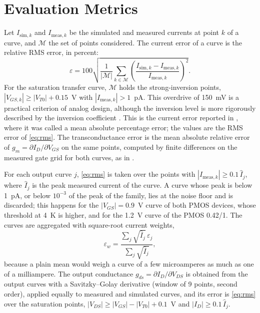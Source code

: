 \documentclass[a4paper,10pt,twoside,twocolumn,final]{JICS_LaTexGuidelines} %
\begin{document}
\section{Evaluation Metrics}

Let $I_{\mathrm{sim},k}$ and $I_{\mathrm{meas},k}$ be the simulated and measured currents at point $k$ of a curve, and $\mathcal{M}$ the set of points considered. The current error of a curve is the relative RMS error, in percent:
\begin{equation}
\varepsilon=100\sqrt{\frac{1}{|\mathcal{M}|}\sum_{k\in\mathcal{M}}\left(\frac{I_{\mathrm{sim},k}-I_{\mathrm{meas},k}}{I_{\mathrm{meas},k}}\right)^{2}}.
\label{eq:rms}
\end{equation}
For the saturation transfer curve, $\mathcal{M}$ holds the strong-inversion points, $|V_{GS,k}|\ge|V_{T0}|+0.15$~V with $|I_{\mathrm{meas},k}|>1$~pA. This overdrive of 150~mV is a practical criterion of analog design, although the inversion level is more rigorously described by the inversion coefficient \cite{b14}. This is the current error reported in \cite{b17}, where it was called a mean absolute percentage error; the values are the RMS error of \eqref{eq:rms}. The transconductance error is the mean absolute relative error of $g_m=\partial I_D/\partial V_{GS}$ on the same points, computed by finite differences on the measured gate grid for both curves, as in \cite{b17}.

For each output curve $j$, \eqref{eq:rms} is taken over the points with $|I_{\mathrm{meas},k}|\ge0.1\,\hat I_j$, where $\hat I_j$ is the peak measured current of the curve. A curve whose peak is below 1~pA, or below $10^{-3}$ of the peak of the family, lies at the noise floor and is discarded; this happens for the $|V_{GS}|=0.9$~V curve of both PMOS devices, whose threshold at 4~K is higher, and for the 1.2~V curve of the PMOS 0.42/1. The curves are aggregated with square-root current weights,
\begin{equation}
\varepsilon_w=\frac{\sum_j\sqrt{\hat I_j}\,\varepsilon_j}{\sum_j\sqrt{\hat I_j}},
\label{eq:weighted}
\end{equation}
because a plain mean would weigh a curve of a few microamperes as much as one of a milliampere. The output conductance $g_{ds}=\partial I_D/\partial V_{DS}$ is obtained from the output curves with a Savitzky--Golay derivative (window of 9 points, second order), applied equally to measured and simulated curves, and its error is \eqref{eq:rms} over the saturation points, $|V_{DS}|\ge|V_{GS}|-|V_{T0}|+0.1$~V and $|I_D|\ge0.1\,\hat I_j$.
\end{document}

